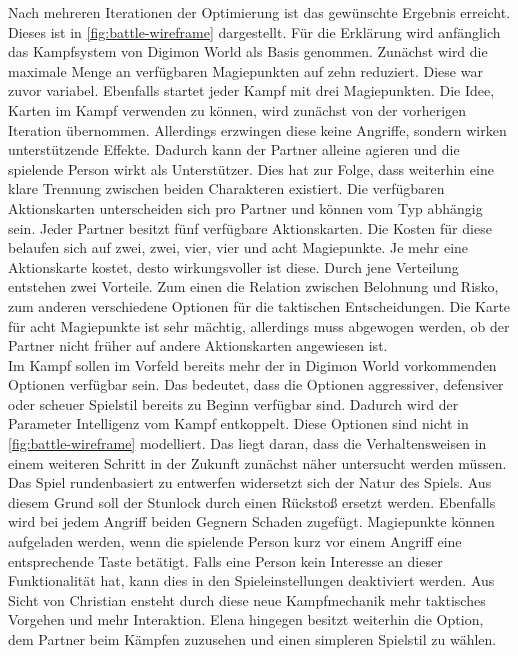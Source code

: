 Nach mehreren Iterationen der Optimierung ist das gewünschte Ergebnis erreicht.
Dieses ist in \autoref{fig:battle-wireframe} dargestellt.
Für die Erklärung wird anfänglich das Kampfsystem von Digimon World als Basis genommen.
Zunächst wird die maximale Menge an verfügbaren Magiepunkten auf zehn reduziert.
Diese war zuvor variabel. Ebenfalls startet jeder Kampf mit drei Magiepunkten.
Die Idee, Karten im Kampf verwenden zu können, wird zunächst von der vorherigen Iteration übernommen.
Allerdings erzwingen diese keine Angriffe, sondern wirken unterstützende Effekte.
Dadurch kann der Partner alleine agieren und die spielende Person wirkt als Unterstützer.
Dies hat zur Folge, dass weiterhin eine klare Trennung zwischen beiden Charakteren existiert.
Die verfügbaren Aktionskarten unterscheiden sich pro Partner und können vom Typ abhängig sein.
Jeder Partner besitzt fünf verfügbare Aktionskarten.
Die Kosten für diese belaufen sich auf zwei, zwei, vier, vier und acht Magiepunkte.
Je mehr eine Aktionskarte kostet, desto wirkungsvoller ist diese.
Durch jene Verteilung entstehen zwei Vorteile.
Zum einen die Relation zwischen Belohnung und Risko, zum anderen verschiedene Optionen für die taktischen Entscheidungen.
Die Karte für acht Magiepunkte ist sehr mächtig, allerdings muss abgewogen werden, ob der Partner nicht früher auf andere Aktionskarten angewiesen ist.\\

Im Kampf sollen im Vorfeld bereits mehr der in Digimon World vorkommenden Optionen verfügbar sein.
Das bedeutet, dass die Optionen aggressiver, defensiver oder scheuer Spielstil bereits zu Beginn verfügbar sind.
Dadurch wird der Parameter Intelligenz vom Kampf entkoppelt.
Diese Optionen sind nicht in \autoref{fig:battle-wireframe} modelliert.
Das liegt daran, dass die Verhaltensweisen in einem weiteren Schritt in der Zukunft zunächst näher untersucht werden müssen.
Das Spiel rundenbasiert zu entwerfen widersetzt sich der Natur des Spiels.
Aus diesem Grund soll der Stunlock durch einen Rückstoß ersetzt werden.
Ebenfalls wird bei jedem Angriff beiden Gegnern Schaden zugefügt.
Magiepunkte können aufgeladen werden, wenn die spielende Person kurz vor einem Angriff eine entsprechende Taste betätigt.
Falls eine Person kein Interesse an dieser Funktionalität hat, kann dies in den Spieleinstellungen deaktiviert werden.
Aus Sicht von Christian ensteht durch diese neue Kampfmechanik mehr taktisches Vorgehen und mehr Interaktion.
Elena hingegen besitzt weiterhin die Option, dem Partner beim Kämpfen zuzusehen und einen simpleren Spielstil zu wählen.\\

